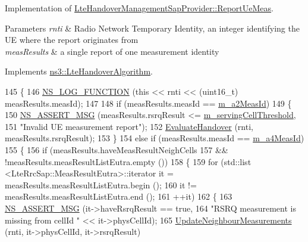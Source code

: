 Implementation of \hyperlink{classns3_1_1LteHandoverManagementSapProvider_a5daca6a055e4f8794f7f1e8ba1077b15}{Lte\+Handover\+Management\+Sap\+Provider\+::\+Report\+Ue\+Meas}. 


\begin{DoxyParams}{Parameters}
{\em rnti} & Radio Network Temporary Identity, an integer identifying the UE where the report originates from \\
\hline
{\em meas\+Results} & a single report of one measurement identity \\
\hline
\end{DoxyParams}


Implements \hyperlink{classns3_1_1LteHandoverAlgorithm_a6ff069477dd5902b2e564e5cf88bac64}{ns3\+::\+Lte\+Handover\+Algorithm}.


\begin{DoxyCode}
145 \{
146   \hyperlink{log-macros-disabled_8h_a90b90d5bad1f39cb1b64923ea94c0761}{NS\_LOG\_FUNCTION} (\textcolor{keyword}{this} << rnti << (uint16\_t) measResults.measId);
147 
148   \textcolor{keywordflow}{if} (measResults.measId == \hyperlink{classns3_1_1A2A4RsrqHandoverAlgorithm_ac52e42e6ee41a0faffdcbc75ff7e2e02}{m\_a2MeasId})
149     \{
150       \hyperlink{assert_8h_aff5ece9066c74e681e74999856f08539}{NS\_ASSERT\_MSG} (measResults.rsrqResult <= 
      \hyperlink{classns3_1_1A2A4RsrqHandoverAlgorithm_acb5609bb57548a7cd9fe92fbef4dd99b}{m\_servingCellThreshold},
151                      \textcolor{stringliteral}{"Invalid UE measurement report"});
152       \hyperlink{classns3_1_1A2A4RsrqHandoverAlgorithm_a95414290544e888109dd5cbb5c022512}{EvaluateHandover} (rnti, measResults.rsrqResult);
153     \}
154   \textcolor{keywordflow}{else} \textcolor{keywordflow}{if} (measResults.measId == \hyperlink{classns3_1_1A2A4RsrqHandoverAlgorithm_acad13d470305131b7cfa66f5feb0f0bf}{m\_a4MeasId})
155     \{
156       \textcolor{keywordflow}{if} (measResults.haveMeasResultNeighCells
157           && !measResults.measResultListEutra.empty ())
158         \{
159           \textcolor{keywordflow}{for} (std::list <LteRrcSap::MeasResultEutra>::iterator it = measResults.measResultListEutra.begin 
      ();
160                it != measResults.measResultListEutra.end ();
161                ++it)
162             \{
163               \hyperlink{assert_8h_aff5ece9066c74e681e74999856f08539}{NS\_ASSERT\_MSG} (it->haveRsrqResult == \textcolor{keyword}{true},
164                              \textcolor{stringliteral}{"RSRQ measurement is missing from cellId "} << it->physCellId);
165               \hyperlink{classns3_1_1A2A4RsrqHandoverAlgorithm_a789156746868d391bf23b1b185a3e328}{UpdateNeighbourMeasurements} (rnti, it->physCellId, it->rsrqResult)

\end{DoxyCode}
